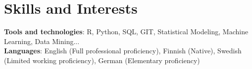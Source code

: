 \documentclass[A4,10pt]{article}
\begin{document}
	\section{Skills and Interests}
	\begin{itemize}[leftmargin=0.5cm, label={}]
		\small{\item{
				\textbf{Tools and technologies}{: R, Python, SQL, GIT, Statistical Modeling, Machine Learning, Data Mining...} \\
				\textbf{Languages}{: English (Full professional proficiency), Finnish (Native), Swedish (Limited working proficiency), German (Elementary proficiency)} \\		
		}}
	\end{itemize}
\end{document}
